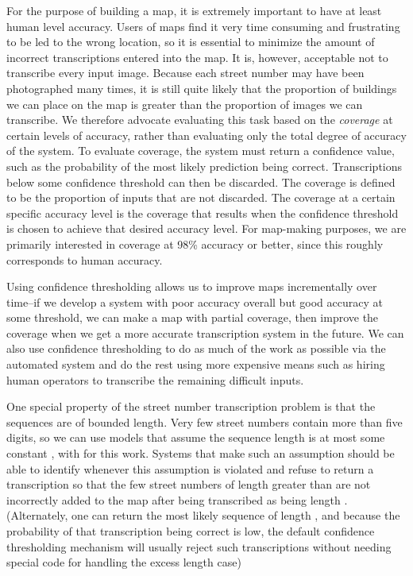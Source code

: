 \documentclass{article} \usepackage{comment}
\begin{document}
For the purpose of building a map, it is extremely important to have at least human level accuracy.
Users of maps find it very time consuming and frustrating to be led to the wrong location, so it is
essential to minimize the amount of incorrect transcriptions entered into the map. It is, however,
acceptable not to transcribe every input image. Because each street number may have been photographed many
times, it is still quite likely that the proportion of buildings we can place on the map is greater than
the proportion of images we can transcribe. We therefore advocate evaluating this task based on the
{\em coverage} at certain levels of accuracy, rather than evaluating only the total degree of accuracy
of the system. To evaluate coverage, the system must return a confidence value, such as the probability
of the most likely prediction being correct. Transcriptions below some confidence threshold can then
be discarded. The coverage is defined to be the proportion of inputs that are not discarded. The
coverage at a certain specific accuracy level is the coverage that results when the confidence threshold
is chosen to achieve that desired accuracy level. For map-making purposes, we are primarily interested
in coverage at 98\% accuracy or better, since this roughly corresponds to human accuracy.

Using confidence thresholding allows us to improve maps incrementally over time--if we develop a system
with poor accuracy overall but good accuracy at some threshold, we can make a map with partial coverage,
then improve the coverage when we get a more accurate transcription system in the future. We can also
use confidence thresholding to do as much of the work as possible via the automated system and do the
rest using more expensive means such as hiring human operators to transcribe the remaining difficult inputs.

One special property of the street number transcription problem is that the sequences are of bounded
length. Very few street numbers contain more than five digits, so we can use models that assume the
sequence length  is at most some constant , with  for this work. Systems that make such
an assumption should be able to identify whenever this assumption is violated and refuse to return a
transcription so that the few street numbers of length greater than  are not incorrectly added to
the map after being transcribed as being length . (Alternately, one can return the most likely
sequence of length , and because the probability of that transcription being correct is low, the
default confidence thresholding mechanism will usually reject such transcriptions without needing
special code for handling the excess length case)
\end{document}
